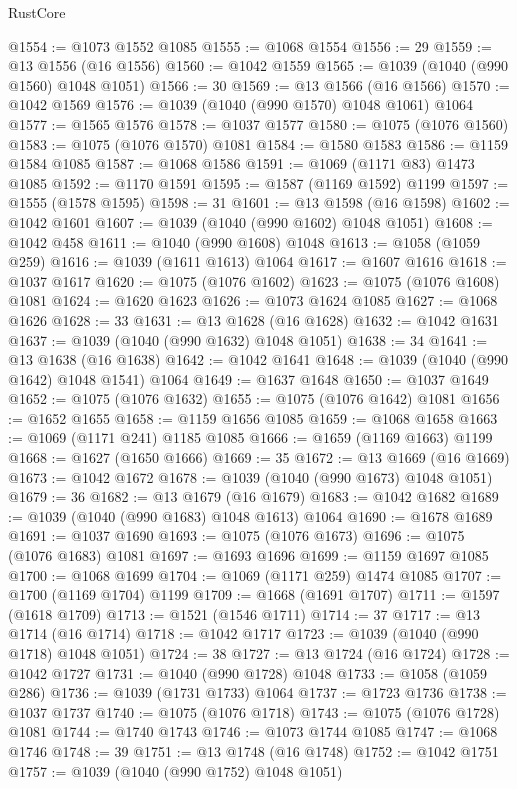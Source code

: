 \begin{lexlean}{RustCore}
\begin{coremodule}
@1554 := @1073 @1552 @1085
@1555 := @1068 @1554
@1556 := 29
@1559 := @13 @1556 (@16 @1556)
@1560 := @1042 @1559
@1565 := @1039 (@1040 (@990 @1560) @1048 @1051)
@1566 := 30
@1569 := @13 @1566 (@16 @1566)
@1570 := @1042 @1569
@1576 := @1039 (@1040 (@990 @1570) @1048 @1061) @1064
@1577 := @1565 @1576
@1578 := @1037 @1577
@1580 := @1075 (@1076 @1560)
@1583 := @1075 (@1076 @1570) @1081
@1584 := @1580 @1583
@1586 := @1159 @1584 @1085
@1587 := @1068 @1586
@1591 := @1069 (@1171 @83) @1473 @1085
@1592 := @1170 @1591
@1595 := @1587 (@1169 @1592) @1199
@1597 := @1555 (@1578 @1595)
@1598 := 31
@1601 := @13 @1598 (@16 @1598)
@1602 := @1042 @1601
@1607 := @1039 (@1040 (@990 @1602) @1048 @1051)
@1608 := @1042 @458
@1611 := @1040 (@990 @1608) @1048
@1613 := @1058 (@1059 @259)
@1616 := @1039 (@1611 @1613) @1064
@1617 := @1607 @1616
@1618 := @1037 @1617
@1620 := @1075 (@1076 @1602)
@1623 := @1075 (@1076 @1608) @1081
@1624 := @1620 @1623
@1626 := @1073 @1624 @1085
@1627 := @1068 @1626
@1628 := 33
@1631 := @13 @1628 (@16 @1628)
@1632 := @1042 @1631
@1637 := @1039 (@1040 (@990 @1632) @1048 @1051)
@1638 := 34
@1641 := @13 @1638 (@16 @1638)
@1642 := @1042 @1641
@1648 := @1039 (@1040 (@990 @1642) @1048 @1541) @1064
@1649 := @1637 @1648
@1650 := @1037 @1649
@1652 := @1075 (@1076 @1632)
@1655 := @1075 (@1076 @1642) @1081
@1656 := @1652 @1655
@1658 := @1159 @1656 @1085
@1659 := @1068 @1658
@1663 := @1069 (@1171 @241) @1185 @1085
@1666 := @1659 (@1169 @1663) @1199
@1668 := @1627 (@1650 @1666)
@1669 := 35
@1672 := @13 @1669 (@16 @1669)
@1673 := @1042 @1672
@1678 := @1039 (@1040 (@990 @1673) @1048 @1051)
@1679 := 36
@1682 := @13 @1679 (@16 @1679)
@1683 := @1042 @1682
@1689 := @1039 (@1040 (@990 @1683) @1048 @1613) @1064
@1690 := @1678 @1689
@1691 := @1037 @1690
@1693 := @1075 (@1076 @1673)
@1696 := @1075 (@1076 @1683) @1081
@1697 := @1693 @1696
@1699 := @1159 @1697 @1085
@1700 := @1068 @1699
@1704 := @1069 (@1171 @259) @1474 @1085
@1707 := @1700 (@1169 @1704) @1199
@1709 := @1668 (@1691 @1707)
@1711 := @1597 (@1618 @1709)
@1713 := @1521 (@1546 @1711)
@1714 := 37
@1717 := @13 @1714 (@16 @1714)
@1718 := @1042 @1717
@1723 := @1039 (@1040 (@990 @1718) @1048 @1051)
@1724 := 38
@1727 := @13 @1724 (@16 @1724)
@1728 := @1042 @1727
@1731 := @1040 (@990 @1728) @1048
@1733 := @1058 (@1059 @286)
@1736 := @1039 (@1731 @1733) @1064
@1737 := @1723 @1736
@1738 := @1037 @1737
@1740 := @1075 (@1076 @1718)
@1743 := @1075 (@1076 @1728) @1081
@1744 := @1740 @1743
@1746 := @1073 @1744 @1085
@1747 := @1068 @1746
@1748 := 39
@1751 := @13 @1748 (@16 @1748)
@1752 := @1042 @1751
@1757 := @1039 (@1040 (@990 @1752) @1048 @1051)

\end{coremodule}
\end{lexlean}
